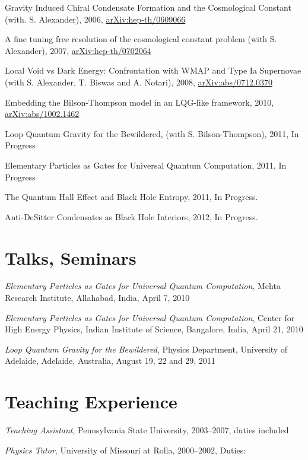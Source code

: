 \documentclass[letterpaper]{article}
\renewenvironment{itemize}{
  \begin{list}{}{
    \setlength{\leftmargin}{1.5em}
  }
}{
  \end{list}
}
\begin{document}
\begin{itemize}
\item Gravity Induced Chiral Condensate Formation and the Cosmological Constant (with. S. Alexander), 2006, \href{http://www.arxiv.org/hep-th/0609066}{arXiv:hep-th/0609066}
\item A fine tuning free resolution of the cosmological constant problem (with S. Alexander), 2007, \href{http://www.arxiv.org/hep-th/0702064}{arXiv:hep-th/0702064}
\item Local Void vs Dark Energy: Confrontation with WMAP and Type Ia Supernovae (with S. Alexander, T. Biswas and A. Notari), 2008, \href{http://www.arxiv.org/abs/0712.0370}{arXiv:abs/0712.0370}
\item Embedding the Bilson-Thompson model in an LQG-like framework, 2010, \href{http://www.arxiv.org/abs/1002.1462}{arXiv:abs/1002.1462}
\item Loop Quantum Gravity for the Bewildered, (with S. Bilson-Thompson), 2011, In Progress
\item Elementary Particles as Gates for Universal Quantum Computation, 2011, In Progress
\item The Quantum Hall Effect and Black Hole Entropy, 2011, In Progress.
\item Anti-DeSitter Condensates as Black Hole Interiors, 2012, In Progress.
\end{itemize}

\section*{Talks, Seminars}
\begin{itemize}
	\item \emph{Elementary Particles as Gates for Universal Quantum Computation}, Mehta Research Institute, Allahabad, India, April 7, 2010
	\item \emph{Elementary Particles as Gates for Universal Quantum Computation}, Center for High Energy Physics, Indian Institute of Science, Bangalore, India, April 21, 2010
	\item \emph{Loop Quantum Gravity for the Bewildered}, Physics Department, University of Adelaide, Adelaide, Australia, August 19, 22 and 29, 2011
\end{itemize}

\section*{Teaching Experience}
\begin{itemize}
	\item \textit{Teaching Assistant}, Pennsylvania State University, 2003--2007, duties included 
	\item \textit{Physics Tutor}, University of Missouri at Rolla, 2000--2002, Duties:
\end{itemize}
\end{document}
